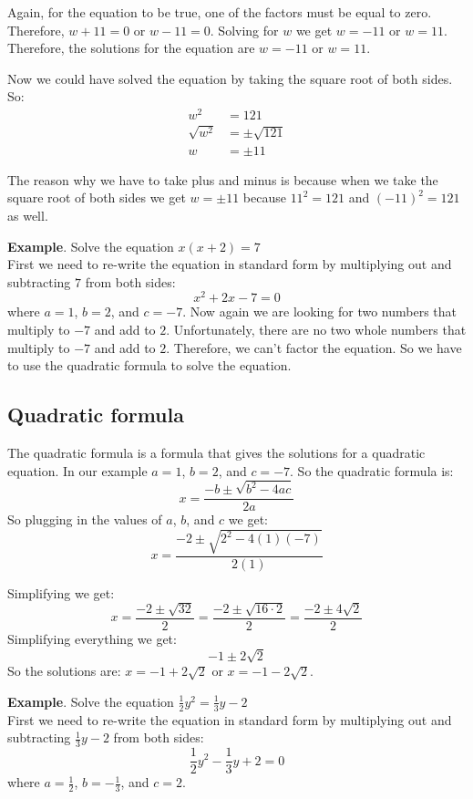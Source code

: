 Again, for the equation to be true, one of the factors must be equal to zero. Therefore, $w+11=0$ or $w-11=0$. Solving for $w$ we get $w=-11$ or $w=11$. Therefore, the solutions for the equation are $w=-11$ or $w=11$.

Now we could have solved the equation by taking the square root of both sides. So:
\begin{align*}
    w^2&=121 \\
    \sqrt{w^2}&=\pm \sqrt{121} \\
    w&=\pm 11
\end{align*}

The reason why we have to take plus and minus is because when we take the square root of both sides we get $w=\pm 11$ because $11^2=121$ and $(-11)^2=121$ as well.

\textbf{Example}. Solve the equation $x(x+2) = 7$
\\
First we need to re-write the equation in standard form by multiplying out and subtracting $7$ from both sides:
$$x^2+2x-7=0$$ where $a=1$, $b=2$, and $c=-7$.
Now again we are looking for two numbers that multiply to $-7$ and add to $2$. Unfortunately, there are no two whole numbers that multiply to $-7$ and add to $2$. Therefore, we can't factor the equation. So we have to use the quadratic formula to solve the equation.
\subsection{Quadratic formula}
The quadratic formula is a formula that gives the solutions for a quadratic equation. In our example $a = 1$, $b = 2$, and $c = -7$. So the quadratic formula is:
$$x=\frac{-b \pm \sqrt{b^2-4ac}}{2a}$$
So plugging in the values of $a$, $b$, and $c$ we get:
$$x=\frac{-2 \pm \sqrt{2^2-4(1)(-7)}}{2(1)}$$

Simplifying we get:
$$x=\frac{-2 \pm \sqrt{32}}{2} = \frac{-2\pm\sqrt{16\cdot2}}{2} = \frac{-2\pm4\sqrt{2}}{2} $$
Simplifying everything we get: 
$$ -1\pm2\sqrt{2} $$
So the solutions are: $x=-1+2\sqrt{2}$ or $x=-1-2\sqrt{2}$.

\textbf{Example}. Solve the equation $\frac{1}{2}y^2 = \frac{1}{3}y-2$ \\

First we need to re-write the equation in standard form by multiplying out and subtracting $\frac{1}{3}y-2$ from both sides:
$$\frac{1}{2}y^2-\frac{1}{3}y+2=0$$ where $a=\frac{1}{2}$, $b=-\frac{1}{3}$, and $c=2$.